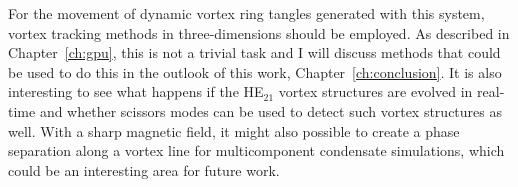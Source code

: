 For the movement of dynamic vortex ring tangles generated with this system, vortex tracking methods in three-dimensions should be employed.
As described in Chapter~\ref{ch:gpu}, this is not a trivial task and I will discuss methods that could be used to do this in the outlook of this work, Chapter~\ref{ch:conclusion}.
It is also interesting to see what happens if the HE$_{21}$ vortex structures are evolved in real-time and whether scissors modes can be used to detect such vortex structures as well.
With a sharp magnetic field, it might also possible to create a phase separation along a vortex line for multicomponent condensate simulations, which could be an interesting area for future work.
